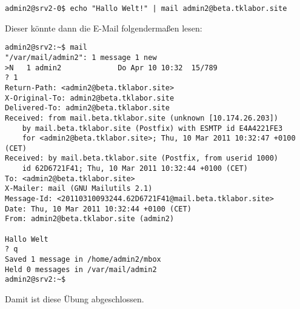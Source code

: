 \begin{lstlisting}
admin2@srv2-0$ echo "Hallo Welt!" | mail admin2@beta.tklabor.site
\end{lstlisting}

Dieser könnte dann die E-Mail folgendermaßen lesen:

\begin{lstlisting}
admin2@srv2:~$ mail
"/var/mail/admin2": 1 message 1 new
>N   1 admin2             Do Apr 10 10:32  15/789   
? 1
Return-Path: <admin2@beta.tklabor.site>
X-Original-To: admin2@beta.tklabor.site
Delivered-To: admin2@beta.tklabor.site
Received: from mail.beta.tklabor.site (unknown [10.174.26.203])
	by mail.beta.tklabor.site (Postfix) with ESMTP id E4A4221FE3
	for <admin2@beta.tklabor.site>; Thu, 10 Mar 2011 10:32:47 +0100 (CET)
Received: by mail.beta.tklabor.site (Postfix, from userid 1000)
	id 62D6721F41; Thu, 10 Mar 2011 10:32:44 +0100 (CET)
To: <admin2@beta.tklabor.site>
X-Mailer: mail (GNU Mailutils 2.1)
Message-Id: <20110310093244.62D6721F41@mail.beta.tklabor.site>
Date: Thu, 10 Mar 2011 10:32:44 +0100 (CET)
From: admin2@beta.tklabor.site (admin2)

Hallo Welt
? q
Saved 1 message in /home/admin2/mbox
Held 0 messages in /var/mail/admin2
admin2@srv2:~$ 
\end{lstlisting}
Damit ist diese Übung abgeschlossen.
